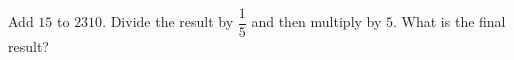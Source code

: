 Add $15$ to $2310$. Divide the result by $\dfrac{1}{5}$ and then multiply by $5$. What is the final result?
